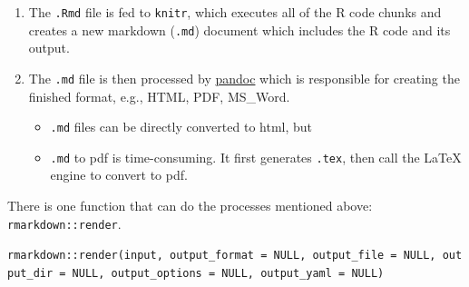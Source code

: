\documentclass[
  a4paper,
  twoside,
  openright]{book}
\providecommand{\tightlist}{%
  \setlength{\itemsep}{0pt}\setlength{\parskip}{0pt}}
\theoremstyle{definition}
\theoremstyle{definition}
\theoremstyle{definition}
\theoremstyle{definition}
\theoremstyle{remark}
\begin{document}
\begin{enumerate}
\def\labelenumi{\arabic{enumi}.}
\tightlist
\item
  The \texttt{.Rmd} file is fed to \texttt{knitr}, which executes all of the R code chunks and creates a new markdown (\texttt{.md}) document which includes the R code and its output.
\item
  The \texttt{.md} file is then processed by \href{http://pandoc.org/}{pandoc} which is responsible for creating the finished format, e.g., HTML, PDF, MS\_Word.

  \begin{itemize}
  \tightlist
  \item
    \texttt{.md} files can be directly converted to html, but
  \item
    \texttt{.md} to pdf is time-consuming. It first generates \texttt{.tex}, then call the LaTeX engine to convert to pdf.
  \end{itemize}
\end{enumerate}

There is one function that can do the processes mentioned above: \texttt{rmarkdown::render}.

\texttt{rmarkdown::render(input,\ output\_format\ =\ NULL,\ output\_file\ =\ NULL,\ output\_dir\ =\ NULL,\ output\_options\ =\ NULL,\ output\_yaml\ =\ NULL)}
\end{document}
